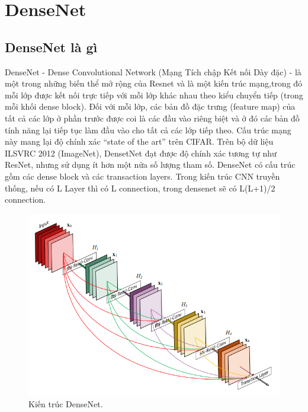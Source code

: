 \section{DenseNet}
\subsection{DenseNet là gì}
DenseNet - Dense Convolutional Network (Mạng Tích chập Kết nối Dày đặc) - là một trong những biến thể mở rộng của Resnet và là một kiến trúc mạng,trong đó mỗi lớp được kết nối trực tiếp với mỗi lớp khác nhau theo kiểu chuyển tiếp (trong mỗi khối dense block). Đối với mỗi lớp, các bản đồ đặc trưng (feature map) của tất cả các lớp ở phần trước được coi là các đầu vào riêng biệt và ở đó các bản đồ tính năng lại tiếp tục làm đầu vào cho tất cả các lớp tiếp theo. Cấu trúc mạng này mang lại độ chính xác “state of the art” trên CIFAR. Trên bộ dữ liệu ILSVRC 2012 (ImageNet), DensetNet đạt được độ chính xác tương tự như ResNet, nhưng sử dụng ít hơn một nửa số lượng tham số. DenseNet có cấu trúc gồm các dense block và các transaction layers. Trong kiến trúc CNN truyền thống, nếu có L Layer thì có L connection, trong densenet sẽ có L(L+1)/2 connection\cite{densenetlagi}.

\begin{figure}[H]
	\centering
	\includegraphics[width=0.8\linewidth]{images/densenet_hl}
	\caption{Kiến trúc DenseNet.}
	\label{fig:kien_truc_densenet}
\end{figure} 

